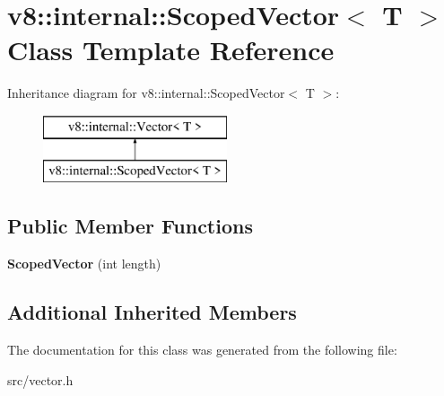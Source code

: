 \hypertarget{classv8_1_1internal_1_1_scoped_vector}{}\section{v8\+:\+:internal\+:\+:Scoped\+Vector$<$ T $>$ Class Template Reference}
\label{classv8_1_1internal_1_1_scoped_vector}
Inheritance diagram for v8\+:\+:internal\+:\+:Scoped\+Vector$<$ T $>$\+:\begin{figure}[H]
\begin{center}
\leavevmode
\includegraphics[height=2.000000cm]{classv8_1_1internal_1_1_scoped_vector}
\end{center}
\end{figure}
\subsection*{Public Member Functions}
\begin{DoxyCompactItemize}
\item 
\hypertarget{classv8_1_1internal_1_1_scoped_vector_abf437127696dc144a2be43af4130f3c7}{}{\bfseries Scoped\+Vector} (int length)\label{classv8_1_1internal_1_1_scoped_vector_abf437127696dc144a2be43af4130f3c7}

\end{DoxyCompactItemize}
\subsection*{Additional Inherited Members}


The documentation for this class was generated from the following file\+:\begin{DoxyCompactItemize}
\item 
src/vector.\+h\end{DoxyCompactItemize}
